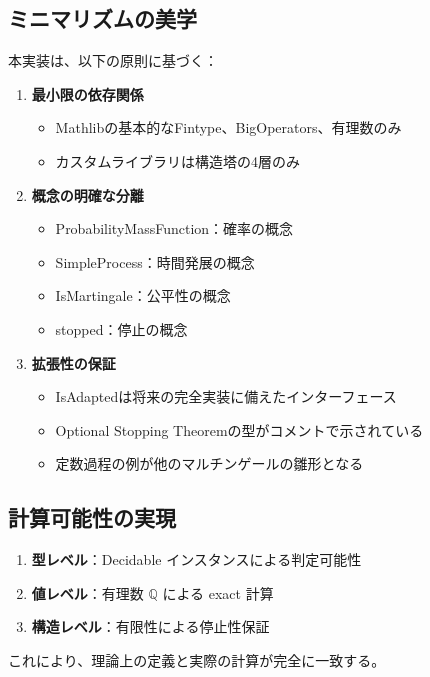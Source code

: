 \documentclass[a4paper,12pt]{ltjsarticle}
\theoremstyle{definition}
\begin{document}
\subsection{ミニマリズムの美学}

本実装は、以下の原則に基づく：

\begin{enumerate}
\item \textbf{最小限の依存関係}
  \begin{itemize}
    \item Mathlibの基本的なFintype、BigOperators、有理数のみ
    \item カスタムライブラリは構造塔の4層のみ
  \end{itemize}

\item \textbf{概念の明確な分離}
  \begin{itemize}
    \item ProbabilityMassFunction：確率の概念
    \item SimpleProcess：時間発展の概念
    \item IsMartingale：公平性の概念
    \item stopped：停止の概念
  \end{itemize}

\item \textbf{拡張性の保証}
  \begin{itemize}
    \item IsAdaptedは将来の完全実装に備えたインターフェース
    \item Optional Stopping Theoremの型がコメントで示されている
    \item 定数過程の例が他のマルチンゲールの雛形となる
  \end{itemize}
\end{enumerate}

\subsection{計算可能性の実現}

\begin{conceptbox}[計算可能性の3層]
\begin{enumerate}
\item \textbf{型レベル}：Decidable インスタンスによる判定可能性
\item \textbf{値レベル}：有理数 $\mathbb{Q}$ による exact 計算
\item \textbf{構造レベル}：有限性による停止性保証
\end{enumerate}

これにより、理論上の定義と実際の計算が完全に一致する。
\end{conceptbox}
\end{document}
